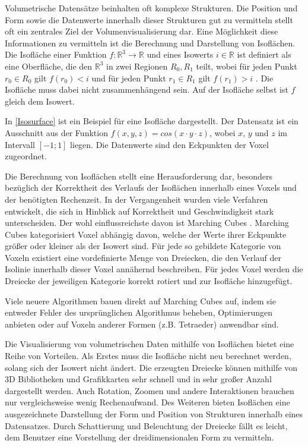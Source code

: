 \documentclass[a4paper,fontsize=12pt,toc=bib,parskip=half,ngerman]{scrartcl}
\begin{document}
Volumetrische Datens\"atze beinhalten oft komplexe Strukturen. Die Position und Form sowie die Datenwerte innerhalb dieser Strukturen gut zu vermitteln stellt oft ein zentrales Ziel der Volumenvisualisierung dar. Eine M\"oglichkeit diese Informationen zu vermitteln ist die Berechnung und Darstellung von Isofl\"achen. Die Isofl\"ache einer Funktion $f: \mathbb{R}^3\rightarrow\mathbb{R}$ und eines Isowerts $i \in \mathbb{R}$ ist definiert als eine Oberfl\"ache, die den $\mathbb{R}^3$ in zwei Regionen $R_0, R_1$ teilt, wobei f\"ur jeden Punkt $r_0 \in R_0$ gilt $f(r_0) < i$ und f\"ur jeden Punkt $r_1 \in R_1$ gilt $f(r_1) > i$ \cite[S.~7]{hansen2005visualization}. Die Isofl\"ache muss dabei nicht zusammenh\"angend sein. Auf der Isofl\"ache selbst ist $f$ gleich dem Isowert. 

In \cref{Isosurface} ist ein Beispiel f\"ur eine Isofl\"ache dargestellt. Der Datensatz ist ein Ausschnitt aus der Funktion $f(x,y,z) = cos(x \cdot y \cdot z)$, wobei $x$, $y$ und $z$ im Intervall $[-1;1]$ liegen. Die Datenwerte sind den Eckpunkten der Voxel zugeordnet. 

Die Berechnung von Isofl\"achen stellt eine Herausforderung dar, besonders bez\"uglich der Korrektheit des Verlaufs der Isofl\"achen innerhalb eines Voxels und der ben\"otigten Rechenzeit. In der Vergangenheit wurden viele Verfahren entwickelt, die sich in Hinblick auf Korrektheit und Geschwindigkeit stark unterscheiden. Der wohl einflussreichste davon ist \glq Marching Cubes\grq{} \cite{lorensen1987marching}. Marching Cubes kategorisiert Voxel abh\"angig davon, welche der Werte ihrer Eckpunkte gr\"o{\ss}er oder kleiner als der Isowert sind. F\"ur jede so gebildete Kategorie von Voxeln existiert eine vordefinierte Menge von Dreiecken, die den Verlauf der Isolinie innerhalb dieser Voxel ann\"ahernd beschreiben. F\"ur jedes Voxel werden die Dreiecke der jeweiligen Kategorie korrekt rotiert und zur Isofl\"ache hinzugef\"ugt.

Viele neuere Algorithmen bauen direkt auf Marching Cubes auf, indem sie entweder Fehler des urspr\"unglichen Algorithmus beheben, Optimierungen anbieten oder auf Voxeln anderer Formen (z.B. Tetraeder) anwendbar sind.

Die Visualisierung von volumetrischen Daten mithilfe von Isofl\"achen bietet eine Reihe von Vorteilen. Als Erstes muss die Isofl\"ache nicht neu berechnet werden, solang sich der Isowert nicht \"andert. Die erzeugten Dreiecke k\"onnen mithilfe von 3D Bibliotheken und Grafikkarten sehr schnell und in sehr gro{\ss}er Anzahl dargestellt werden. Auch Rotation, Zoomen und andere Interaktionen brauchen nur vergleichsweise wenig Rechenaufwand. Des Weiteren bieten Isofl\"achen eine ausgezeichnete Darstellung der Form und Position von Strukturen innerhalb eines Datensatzes. Durch Schattierung und Beleuchtung der Dreiecke f\"allt es leicht, dem Benutzer eine Vorstellung der dreidimensionalen Form zu vermitteln.
\end{document}
